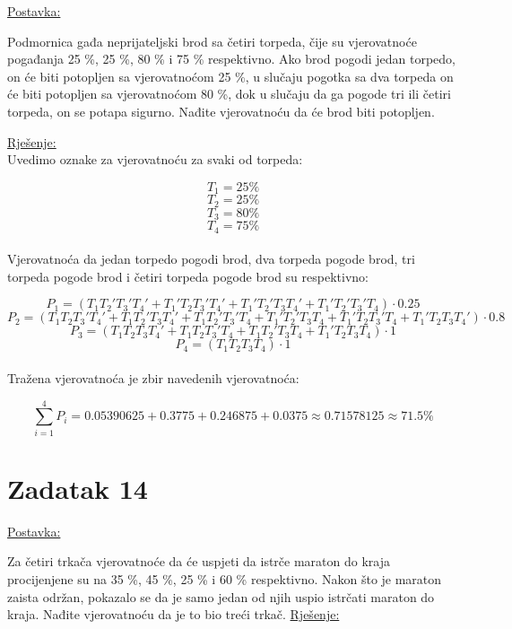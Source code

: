 \documentclass[12pt]{article}
\begin{document}
\underline{Postavka:}
	
Podmornica gađa neprijateljski brod sa četiri torpeda, čije su vjerovatnoće pogađanja 25 \%, 25 \%, 80 \% i 75 \% respektivno. Ako brod pogodi jedan torpedo, on će biti potopljen sa vjerovatnoćom 25 \%, u slučaju pogotka sa dva torpeda on će biti potopljen sa vjerovatnoćom 80 \%, dok u slučaju da ga pogode tri ili četiri torpeda, on se potapa sigurno. Nađite vjerovatnoću da će brod biti potopljen.

\underline{Rješenje:}\\

Uvedimo oznake za vjerovatnoću za svaki od torpeda:

$$T_1 = 25 \%$$
$$T_2 = 25 \%$$
$$T_3 = 80 \%$$
$$T_4 = 75 \%$$\\

Vjerovatnoća da jedan torpedo pogodi brod, dva torpeda pogode brod, tri torpeda pogode brod i četiri torpeda pogode brod su respektivno:

$$P_1 = (T_1 T_2' T_3' T_4' + T_1' T_2 T_3' T_4' + T_1' T_2' T_3 T_4' + T_1' T_2' T_3' T_4 ) \cdot 0.25$$
$$P_2 = (T_1 T_2 T_3' T_4' + T_1 T_2' T_3 T_4' + T_1 T_2' T_3' T_4 +  T_1' T_2' T_3 T_4 +  T_1' T_2 T_3' T_4 +  T_1' T_2 T_3 T_4') \cdot 0.8$$
$$P_3 = (T_1 T_2 T_3 T_4' +  T_1 T_2 T_3' T_4 + T_1 T_2' T_3 T_4 + T_1' T_2 T_3 T_4  ) \cdot 1$$
$$P_4 = (T_1 T_2 T_3 T_4) \cdot 1$$\\

Tražena vjerovatnoća je zbir navedenih vjerovatnoća:

$$\sum_{i=1}^{4} P_i = 0.05390625 + 0.3775 + 0.246875 + 0.0375 \approx 0.71578125 \approx 71.5\%$$

\newpage
\section*{Zadatak 14\label{Z14}}	 

\underline{Postavka:}
	
Za četiri trkača vjerovatnoće da će uspjeti da istrče maraton do kraja procijenjene su na 35 \%, 45 \%, 25 \% i 60 \% respektivno. Nakon što je maraton zaista održan, pokazalo se da je samo jedan od njih uspio istrčati maraton do kraja. Nađite vjerovatnoću da je to bio treći trkač.
\underline{Rješenje:}\\
\end{document}
